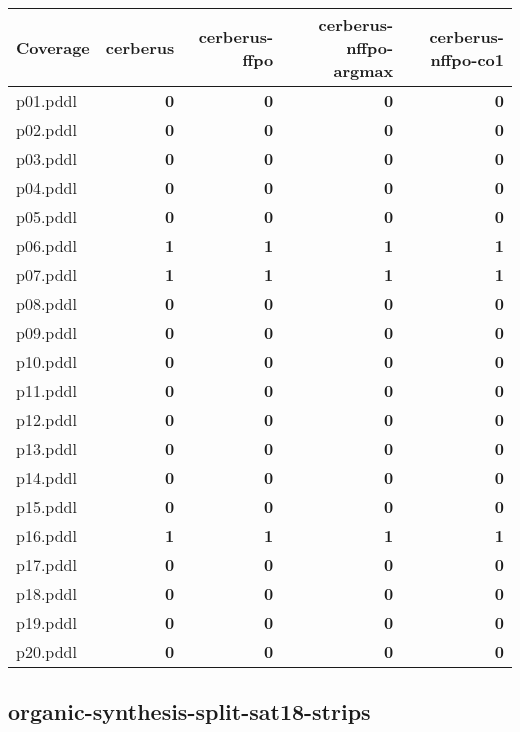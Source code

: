 \documentclass{article}
\begin{document}
\begin{tabular}{@{}lrrrr@{}}
Coverage & cerberus & cerberus-ffpo & cerberus-nffpo-argmax & cerberus-nffpo-co1 \\
\midrule
p01.pddl & \textbf{0} & \textbf{0} & \textbf{0} & \textbf{0} \\
p02.pddl & \textbf{0} & \textbf{0} & \textbf{0} & \textbf{0} \\
p03.pddl & \textbf{0} & \textbf{0} & \textbf{0} & \textbf{0} \\
p04.pddl & \textbf{0} & \textbf{0} & \textbf{0} & \textbf{0} \\
p05.pddl & \textbf{0} & \textbf{0} & \textbf{0} & \textbf{0} \\
p06.pddl & \textbf{1} & \textbf{1} & \textbf{1} & \textbf{1} \\
p07.pddl & \textbf{1} & \textbf{1} & \textbf{1} & \textbf{1} \\
p08.pddl & \textbf{0} & \textbf{0} & \textbf{0} & \textbf{0} \\
p09.pddl & \textbf{0} & \textbf{0} & \textbf{0} & \textbf{0} \\
p10.pddl & \textbf{0} & \textbf{0} & \textbf{0} & \textbf{0} \\
p11.pddl & \textbf{0} & \textbf{0} & \textbf{0} & \textbf{0} \\
p12.pddl & \textbf{0} & \textbf{0} & \textbf{0} & \textbf{0} \\
p13.pddl & \textbf{0} & \textbf{0} & \textbf{0} & \textbf{0} \\
p14.pddl & \textbf{0} & \textbf{0} & \textbf{0} & \textbf{0} \\
p15.pddl & \textbf{0} & \textbf{0} & \textbf{0} & \textbf{0} \\
p16.pddl & \textbf{1} & \textbf{1} & \textbf{1} & \textbf{1} \\
p17.pddl & \textbf{0} & \textbf{0} & \textbf{0} & \textbf{0} \\
p18.pddl & \textbf{0} & \textbf{0} & \textbf{0} & \textbf{0} \\
p19.pddl & \textbf{0} & \textbf{0} & \textbf{0} & \textbf{0} \\
p20.pddl & \textbf{0} & \textbf{0} & \textbf{0} & \textbf{0} \\
\end{tabular}

\hypertarget{coverage-organic-synthesis-split-sat18-strips}{}
\subsection*{organic-synthesis-split-sat18-strips}
\end{document}

